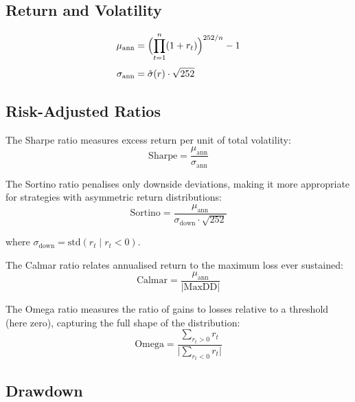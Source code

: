 \documentclass[10pt,twocolumn,a4paper]{article}
\theoremstyle{mydef}
\begin{document}
\subsection{Return and Volatility}

\begin{align}
  \mu_{\mathrm{ann}} &=
    \Bigl(\prod_{t=1}^{n}(1+r_t)\Bigr)^{252/n} - 1
  \label{eq:ann_ret}\\[3pt]
  \sigma_{\mathrm{ann}} &= \hat\sigma(r)\cdot\sqrt{252}
  \label{eq:ann_vol}
\end{align}

\subsection{Risk-Adjusted Ratios}

The Sharpe ratio measures excess return per unit of total volatility:
\begin{equation}
  \text{Sharpe} = \frac{\mu_{\mathrm{ann}}}{\sigma_{\mathrm{ann}}}
  \label{eq:sharpe}
\end{equation}

The Sortino ratio penalises only downside deviations, making it more
appropriate for strategies with asymmetric return distributions:
\begin{equation}
  \text{Sortino} = \frac{\mu_{\mathrm{ann}}}
                        {\sigma_{\mathrm{down}}\cdot\sqrt{252}}
  \label{eq:sortino}
\end{equation}

where $\sigma_{\mathrm{down}} = \mathrm{std}(r_t \mid r_t < 0)$.

The Calmar ratio relates annualised return to the maximum loss ever
sustained:
\begin{equation}
  \text{Calmar} = \frac{\mu_{\mathrm{ann}}}{|\mathrm{MaxDD}|}
  \label{eq:calmar}
\end{equation}

The Omega ratio measures the ratio of gains to losses relative to a
threshold (here zero), capturing the full shape of the distribution:
\begin{equation}
  \text{Omega} = \frac{\displaystyle\sum_{r_t>0} r_t}
                      {\displaystyle\bigl|\sum_{r_t<0} r_t\bigr|}
  \label{eq:omega}
\end{equation}

\subsection{Drawdown}
\end{document}
